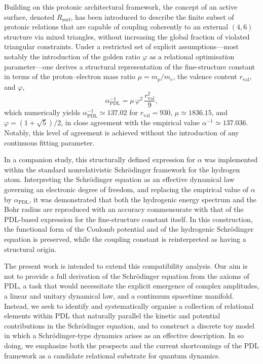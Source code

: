 \documentclass[11pt,a4paper]{article}
\begin{document}
Building on this protonic architectural framework, the concept of an active surface, denoted $R_{\mathrm{surf}}$, has been introduced to describe the finite subset of protonic relations that are capable of coupling coherently to an external $(4,6)$ structure via mixed triangles, without increasing the global fraction of violated triangular constraints.\cite{Laubscher2026DerivationAlpha} Under a restricted set of explicit assumptions—most notably the introduction of the golden ratio $\varphi$ as a relational optimisation parameter—one derives a structural representation of the fine-structure constant in terms of the proton–electron mass ratio $\mu = m_p/m_e$, the valence content $r_{\mathrm{val}}$, and $\varphi$,
\begin{equation}
\alpha_{\mathrm{PDL}}^{-1} = \mu\,\varphi^{2}\,\frac{r_{\mathrm{val}}^{2}}{9},
\label{eq:alphaPDLIntro}
\end{equation}
which numerically yields $\alpha_{\mathrm{PDL}}^{-1} \simeq 137.02$ for $r_{\mathrm{val}}=930$, $\mu \simeq 1836.15$, and $\varphi = (1+\sqrt{5})/2$, in close agreement with the empirical value $\alpha^{-1} \simeq 137.036$.\cite{Laubscher2026DerivationAlpha} Notably, this level of agreement is achieved without the introduction of any continuous fitting parameter.\par In a companion study, this structurally defined expression for $\alpha$ was implemented within the standard nonrelativistic Schr\"odinger framework for the hydrogen atom. Interpreting the Schr\"odinger equation as an effective dynamical law governing an electronic degree of freedom, and replacing the empirical value of $\alpha$ by $\alpha_{\mathrm{PDL}}$, it was demonstrated that both the hydrogenic energy spectrum and the Bohr radius are reproduced with an accuracy commensurate with that of the PDL-based expression for the fine-structure constant itself.\cite{Laubscher2026SchrodingerPDL} In this construction, the functional form of the Coulomb potential and of the hydrogenic Schr\"odinger equation is preserved, while the coupling constant is reinterpreted as having a structural origin.\par The present work is intended to extend this compatibility analysis. Our aim is not to provide a full derivation of the Schr\"odinger equation from the axioms of PDL, a task that would necessitate the explicit emergence of complex amplitudes, a linear and unitary dynamical law, and a continuum spacetime manifold. Instead, we seek to identify and systematically organise a collection of relational elements within PDL that naturally parallel the kinetic and potential contributions in the Schr\"odinger equation, and to construct a discrete toy model in which a Schr\"odinger-type dynamics arises as an effective description. In so doing, we emphasize both the prospects and the current shortcomings of the PDL framework as a candidate relational substrate for quantum dynamics.
\end{document}
